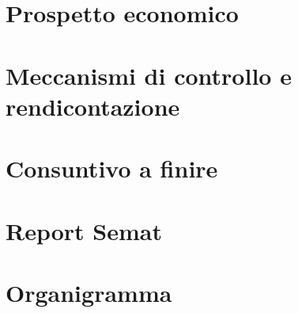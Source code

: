 \section{Prospetto economico}

\newpage
\section{Meccanismi di controllo e rendicontazione}

\newpage
\section{Consuntivo a finire}

\newpage
\appendix 
\section{Report Semat}

\newpage
\section{Organigramma}

\newpage


